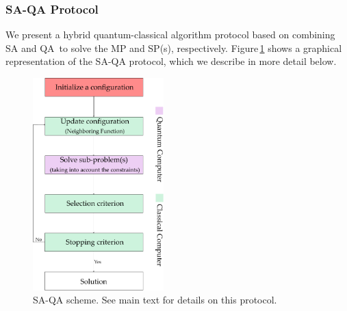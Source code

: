 \subsubsection{SA-QA Protocol}
We present a hybrid quantum-classical algorithm protocol based on combining SA and QA\,\cite{Ding2019ImplementationDesign} to solve the MP and SP(s), respectively. Figure\,\ref{fig:SA_QAProtocol} shows a graphical representation of the SA-QA protocol, which we describe in more detail below. 
\begin{figure}[H]
\centering
\includegraphics[width=0.45\textwidth]{Figures/SAQAProtocol_Layer 1.pdf} 
\caption{SA-QA scheme. See main text for details on this protocol.}
\label{fig:SA_QAProtocol}
\end{figure}

